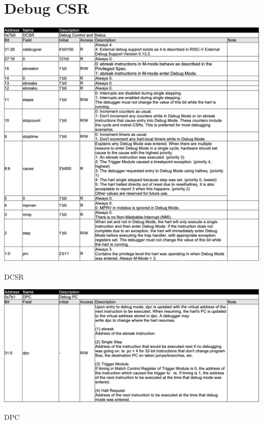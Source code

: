 \section{Debug CSR}

\begin{table}[H]
    \includegraphics[width=1.00\columnwidth]{./Table/DCSR.png}
    \caption{DCSR}
    \label{tb:DCSR}
\end{table}

\begin{table}[H]
    \includegraphics[width=1.00\columnwidth]{./Table/DPC.png}
    \caption{DPC}
    \label{tb:DPC}
\end{table}




